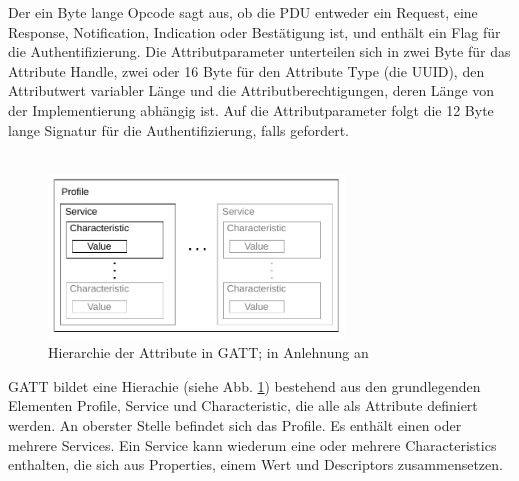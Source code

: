 Der ein Byte lange Opcode sagt aus, ob die PDU entweder ein Request, eine Response, Notification, Indication oder Bestätigung ist, und enthält ein Flag für die Authentifizierung. Die Attributparameter unterteilen sich in zwei Byte für das Attribute Handle, zwei oder 16 Byte für den Attribute Type (die UUID), den Attributwert variabler Länge und die Attributberechtigungen, deren Länge von der Implementierung abhängig ist. Auf die Attributparameter folgt die 12 Byte lange Signatur für die Authentifizierung, falls gefordert. \cite{BtSpec4.0_1888-1889}
\\\\

\begin{figure}[H]
    \centering
    \includegraphics[width=0.7\textwidth]{graphics/gatt_hierarchie.pdf}
    \caption[Hierarchie der Attribute in GATT]{Hierarchie der Attribute in GATT; in Anlehnung an \cite{BtSpec4.0_fig_1892}}
    \label{fig: gatt hierarchie}
\end{figure}

GATT bildet eine Hierachie (siehe Abb. \ref{fig: gatt hierarchie}) bestehend aus den grundlegenden Elementen Profile, Service und Characteristic, die alle als Attribute definiert werden. An oberster Stelle befindet sich das Profile. Es enthält einen oder mehrere Services. Ein Service kann wiederum eine oder mehrere Characteristics enthalten, die sich aus Properties, einem Wert und Descriptors zusammensetzen.